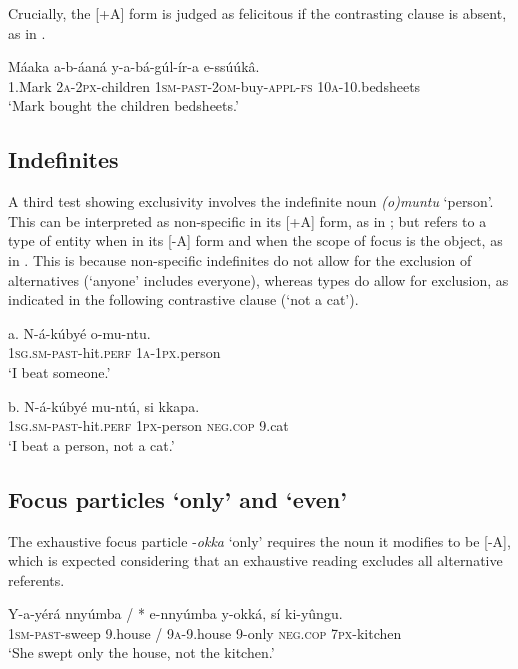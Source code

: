 \documentclass[output=paper]{langsci/langscibook}
\begin{document}
Crucially, the [+A] form is judged as felicitous if the contrasting clause is absent, as in .

\ea
\gll   Máaka  a-b-áaná    y-a-bá-gúl-ír-a      e-ssúúkâ.\\
       1.Mark  \textsc{2a}-\textsc{2px}-children  \textsc{1sm}-\textsc{past}-\textsc{2om}-buy-\textsc{appl}-\textsc{fs}  \textsc{10a}-10.bedsheets\\
\glt   ‘Mark bought the children bedsheets.’
\z

\subsection{Indefinites} %

A third test showing exclusivity involves the indefinite noun \textit{(o)muntu} ‘person’. This can be interpreted as non-specific in its [+A] form, as in ; but refers to a type of entity when in its [-A] form and when the scope of focus is the object, as in . This is because non-specific indefinites do not allow for the exclusion of alternatives (‘anyone’ includes everyone), whereas types do allow for exclusion, as indicated in the following contrastive clause (‘not a cat’).

\ea
\gll   a.  N-á-kúbyé      o-mu-ntu.\\
         \textsc{1sg}.\textsc{sm}-\textsc{past}-hit.\textsc{perf}  \textsc{1a}-\textsc{1px}.person\\
\glt     ‘I beat someone.’
\z

\ea
\gll   b.  N-á-kúbyé      mu-ntú,  si    kkapa.\\
         \textsc{1sg}.\textsc{sm}-\textsc{past}-hit.\textsc{perf}  \textsc{1px}-person  \textsc{neg.cop}  9.cat\\
\glt     ‘I beat a person, not a cat.’
\z

\subsection{Focus particles ‘only’ and ‘even’} %

The exhaustive focus particle -\textit{okka} ‘only’ requires the noun it modifies to be [-A], which is expected considering that an exhaustive reading excludes all alternative referents.

\ea
\gll   Y-a-yérá    nnyúmba /  * e-nnyúmba  y-okká,  sí    ki-yûngu.\\
       \textsc{1sm}-\textsc{past}-sweep  9.house /  \textsc{9a}-9.house  9-only\textsc{  neg}.\textsc{cop}  \textsc{7px}-kitchen\\
\glt ‘She swept only the house, not the kitchen.’
\z
\end{document}
